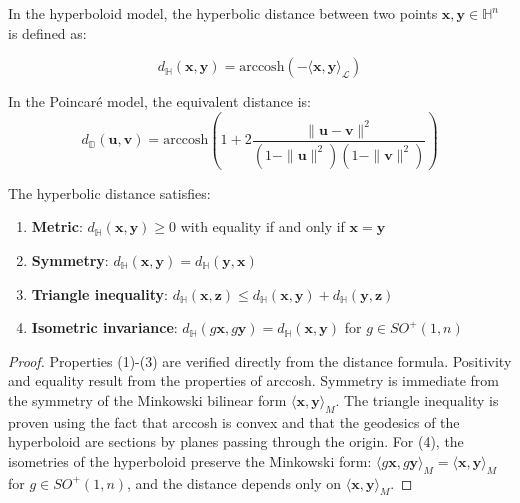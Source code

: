 \begin{definition}\label{def:distancia_hiperbolica}
In the hyperboloid model, the hyperbolic distance between two points $\mathbf{x}, \mathbf{y} \in \mathbb{H}^n$ is defined as:

\begin{equation}
    d_{\mathbb{H}}(\mathbf{x}, \mathbf{y}) = \text{arccosh}(-\langle \mathbf{x}, \mathbf{y} \rangle_{\mathcal{L}})
    \label{eq:hyperbolic_distance}
\end{equation}

In the Poincaré model, the equivalent distance is:
\begin{equation}
d_{\mathbb{D}}(\mathbf{u}, \mathbf{v}) = \text{arccosh}\left(1 + 2\frac{\|\mathbf{u} - \mathbf{v}\|^2}{(1-\|\mathbf{u}\|^2)(1-\|\mathbf{v}\|^2)}\right)
\end{equation}
\end{definition}

\begin{theorem}\label{thm:propiedades_distancia_hiperbolica}
The hyperbolic distance satisfies:
\begin{enumerate}
    \item \textbf{Metric}: $d_{\mathbb{H}}(\mathbf{x}, \mathbf{y}) \geq 0$ with equality if and only if $\mathbf{x} = \mathbf{y}$
    \item \textbf{Symmetry}: $d_{\mathbb{H}}(\mathbf{x}, \mathbf{y}) = d_{\mathbb{H}}(\mathbf{y}, \mathbf{x})$
    \item \textbf{Triangle inequality}: $d_{\mathbb{H}}(\mathbf{x}, \mathbf{z}) \leq d_{\mathbb{H}}(\mathbf{x}, \mathbf{y}) + d_{\mathbb{H}}(\mathbf{y}, \mathbf{z})$
    \item \textbf{Isometric invariance}: $d_{\mathbb{H}}(g\mathbf{x}, g\mathbf{y}) = d_{\mathbb{H}}(\mathbf{x}, \mathbf{y})$ for $g \in SO^+(1,n)$
\end{enumerate}
\end{theorem}

\begin{proof}
Properties (1)-(3) are verified directly from the distance formula. Positivity and equality result from the properties of arccosh. Symmetry is immediate from the symmetry of the Minkowski bilinear form $\langle \mathbf{x}, \mathbf{y} \rangle_M$. The triangle inequality is proven using the fact that arccosh is convex and that the geodesics of the hyperboloid are sections by planes passing through the origin. For (4), the isometries of the hyperboloid preserve the Minkowski form: $\langle g\mathbf{x}, g\mathbf{y} \rangle_M = \langle \mathbf{x}, \mathbf{y} \rangle_M$ for $g \in SO^+(1,n)$, and the distance depends only on $\langle \mathbf{x}, \mathbf{y} \rangle_M$.
\end{proof}

